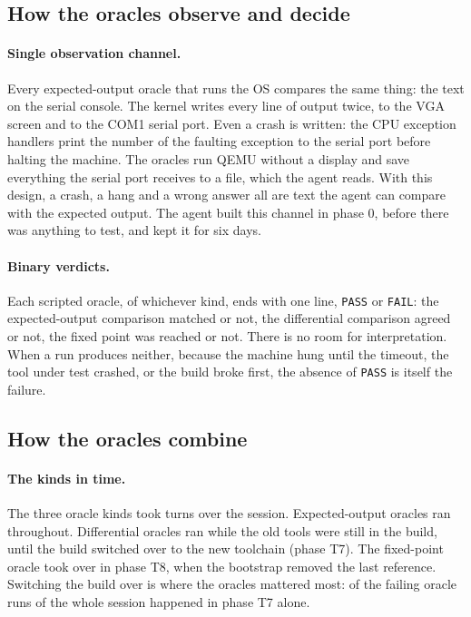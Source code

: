 \documentclass{article}
\begin{document}
\subsection{How the oracles observe and decide}\label{sec:oracleobserve}

\paragraph{Single observation channel.} Every expected-output oracle that runs the OS
compares the same thing: the text on the serial console. The kernel writes every line of
output twice, to the VGA screen and to the COM1 serial port. Even a crash is written:
the CPU exception handlers print the number of the faulting exception to the serial port
before halting the machine. The oracles run QEMU without a display and save everything
the serial port receives to a file, which the agent reads. With this design, a crash, a
hang and a wrong answer all are text the agent can compare with the expected output. The
agent built this channel in phase 0, before there was anything to test, and kept it for
six days.

\paragraph{Binary verdicts.} Each scripted oracle, of whichever kind, ends with one line,
\texttt{PASS} or \texttt{FAIL}: the expected-output comparison matched or not, the
differential comparison agreed or not, the fixed point was reached or not. There is
no room for interpretation. When a run produces neither, because the machine hung until the
timeout, the tool under test crashed, or the build broke first, the absence of
\texttt{PASS} is itself the failure.

\subsection{How the oracles combine}\label{sec:oraclecombine}

\paragraph{The kinds in time.} The three oracle kinds took turns over the session.
Expected-output oracles ran throughout. Differential oracles ran while the old tools were
still in the build, until the build switched over to the new toolchain (phase T7). The
fixed-point oracle took over in phase T8, when the bootstrap removed the last reference.
Switching the build over is where the oracles mattered most: \ntsevenfailed{} of the
\noraclesfailed{} failing oracle runs of the whole session happened in phase T7 alone.
\end{document}
